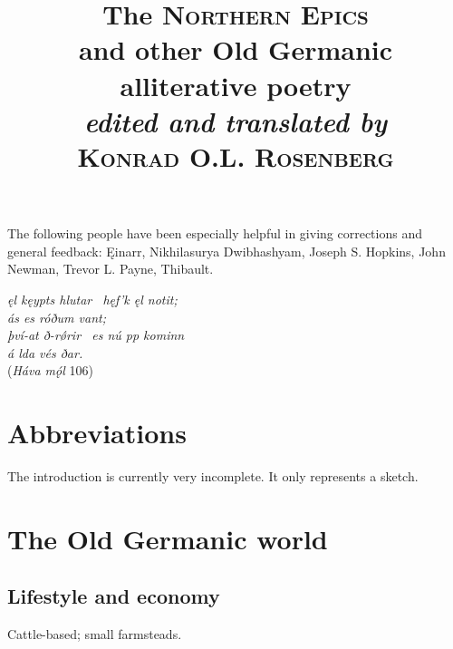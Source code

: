 \title{%
  \Huge The \textsc{Northern Epics} \\
  \large and other Old Germanic alliterative poetry \\
  \large\emph{edited and translated by} \\
  \huge \textsc{Konrad O.L. Rosenberg}
}

\maketitle

\newpage\thispagestyle{empty}

\begin{center} The following people have been especially helpful in giving corrections and general feedback: Ęinarr, Nikhilasurya Dwibhashyam, Joseph S. Hopkins, John Newman, Trevor L. Payne, Thibault.\end{center}

\newpage\thispagestyle{empty}

\begin{center}{\large \emph{ęl kęypts hlutar \hld\ hęf’k ęl notit; \\
ás es róðum vant; \\
því-at ð-rǿrir \hld\ es nú pp kominn \\
á lda vés ðar.}} \\

(\emph{Háva mǫ́l} 106)\end{center}

\newpage\thispagestyle{empty}

\tableofcontents

\newpage

\thispagestyle{empty}\section{Abbreviations}

\newpage


The introduction is currently very incomplete. It only represents a sketch.

\section{The Old Germanic world}

  \subsection{Lifestyle and economy}
    Cattle-based; small farmsteads.
